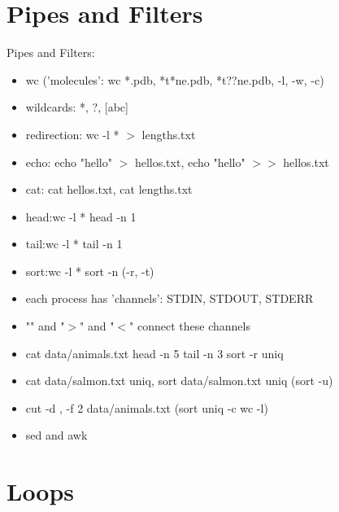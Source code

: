 \documentclass[
 size=12pt,
 paper=screen,
 mode=present,
 display=slidesnotes,
 style=paintings,
 nohandoutpagebreaks,
]{powerdot}
\begin{document}
\section[slide=false]{Pipes and Filters}

\begin{slide}{Pipes and Filters:}
  \begin{itemize}
    \begingroup
    \fontsize{8}{8}\selectfont
     \item wc ('molecules': wc *.pdb, *t*ne.pdb, *t??ne.pdb, -l, -w, -c)
     \item wildcards: *, ?, [abc]
     \item redirection: wc -l * $>$ lengths.txt
     \item echo: echo "hello" $>$ hellos.txt, echo "hello" $>$$>$ hellos.txt
     \item cat: cat hellos.txt, cat lengths.txt
     \item head:wc -l * \textbar head -n 1
     \item tail:wc -l * \textbar tail -n 1
     \item sort:wc -l * \textbar sort -n (-r, -t)
     \item each process has 'channels': STDIN, STDOUT, STDERR
     \item "\textbar" and "$>$" and "$<$" connect these channels
     \item cat data/animals.txt \textbar head -n 5 \textbar tail -n 3 \textbar sort -r \textbar uniq
     \item cat data/salmon.txt \textbar uniq, sort data/salmon.txt \textbar uniq (sort -u)
     \item cut -d , -f 2 data/animals.txt (\textbar sort \textbar uniq -c \textbar wc -l)
     \item sed and awk
    \endgroup
  \end{itemize}
\end{slide}

\section[slide=false]{Loops}
\end{document}
